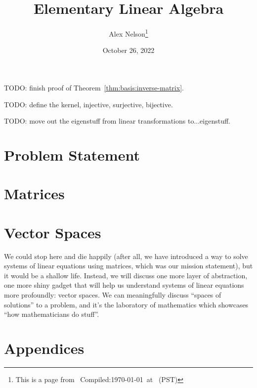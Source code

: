\documentclass{article}
\title{Elementary Linear Algebra}
\author{Alex Nelson\thanks{This is a page from \homeurl{}\hfil\break\indent\;\, Compiled:\enspace\today\ at \currenttime\ (PST)}}
\date{October 26, 2022}
\begin{document}
\maketitle
TODO: finish proof of Theorem~\ref{thm:basis:inverse-matrix}.

TODO: define the kernel, injective, surjective, bijective.

TODO: move out the eigenstuff from linear transformations to...eigenstuff.

\tableofcontents


\part{Problem Statement}

\part{Matrices}\label{part:matrices}




% 

\vfill\eject
\part{Vector Spaces}

We could stop here and die happily (after all, we have introduced a way
to solve systems of linear equations using matrices, which was our
mission statement), but it would be a shallow
life. Instead, we will discuss one more layer of abstraction, one more
shiny gadget that will help us understand systems of linear equations
more profoundly: vector spaces. We can meaningfully discuss ``spaces of
solutions'' to a problem, and it's the laboratory of mathematics which
showcases ``how mathematicians do stuff''.







\vfill\eject
\part{Appendices}
\appendix
%
\vfill\eject

\end{document}
